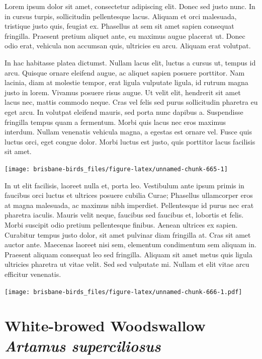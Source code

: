 \documentclass[]{book}
\let\origfigure\figure
\let\endorigfigure\endfigure
\renewenvironment{figure}[1][2] {
  \expandafter\origfigure\expandafter[H]
} {
  \endorigfigure
}
\begin{document}
Lorem ipsum dolor sit amet, consectetur adipiscing elit. Donec sed justo
nunc. In in cursus turpis, sollicitudin pellentesque lacus. Aliquam et
orci malesuada, tristique justo quis, feugiat ex. Phasellus at sem sit
amet sapien consequat fringilla. Praesent pretium aliquet ante, eu
maximus augue placerat ut. Donec odio erat, vehicula non accumsan quis,
ultricies eu arcu. Aliquam erat volutpat.

In hac habitasse platea dictumst. Nullam lacus elit, luctus a cursus ut,
tempus id arcu. Quisque ornare eleifend augue, ac aliquet sapien posuere
porttitor. Nam lacinia, diam at molestie tempor, erat ligula vulputate
ligula, id rutrum magna justo in lorem. Vivamus posuere risus augue. Ut
velit elit, hendrerit sit amet lacus nec, mattis commodo neque. Cras vel
felis sed purus sollicitudin pharetra eu eget arcu. In volutpat eleifend
mauris, sed porta nunc dapibus a. Suspendisse fringilla tempus quam a
fermentum. Morbi quis lacus nec eros maximus interdum. Nullam venenatis
vehicula magna, a egestas est ornare vel. Fusce quis luctus orci, eget
congue dolor. Morbi luctus est justo, quis porttitor lacus facilisis sit
amet.

\begin{figure}
\texttt{[image: brisbane-birds\_files/figure-latex/unnamed-chunk-665-1]} \caption{insert figure caption}\label{fig:unnamed-chunk-665}
\end{figure}

In ut elit facilisis, laoreet nulla et, porta leo. Vestibulum ante ipsum
primis in faucibus orci luctus et ultrices posuere cubilia Curae;
Phasellus ullamcorper eros at magna malesuada, ac maximus nibh
imperdiet. Pellentesque id purus nec erat pharetra iaculis. Mauris velit
neque, faucibus sed faucibus et, lobortis et felis. Morbi suscipit odio
pretium pellentesque finibus. Aenean ultrices ex sapien. Curabitur
tempus justo dolor, sit amet pulvinar diam fringilla at. Cras sit amet
auctor ante. Maecenas laoreet nisi sem, elementum condimentum sem
aliquam in. Praesent aliquam consequat leo sed fringilla. Aliquam sit
amet metus quis ligula ultricies pharetra ut vitae velit. Sed sed
vulputate mi. Nullam et elit vitae arcu efficitur venenatis.

\begin{figure}
\centering
\texttt{[image: brisbane-birds\_files/figure-latex/unnamed-chunk-666-1.pdf]}
\caption{\label{fig:unnamed-chunk-666}insert figure caption}
\end{figure}

\section{\texorpdfstring{White-browed Woodswallow \emph{Artamus
superciliosus}}{White-browed Woodswallow Artamus superciliosus}}\label{white-browed-woodswallow-artamus-superciliosus}
\end{document}
